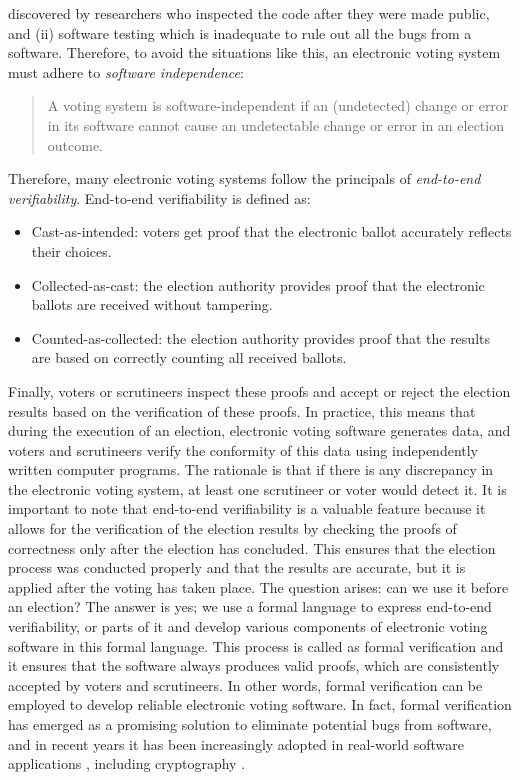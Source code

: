 \documentclass[conference,compsoc]{IEEEtran}
\begin{document}
discovered by researchers who inspected the code after they were made public, and 
(ii) software testing which is inadequate to rule out all the bugs 
from a software. Therefore, to avoid the situations like this, 
an electronic voting system must adhere to \textit{software independence}\cite{rivest2008notion}:
\begin{quote}
  A voting system is software-independent if an
  (undetected) change or error in its software cannot
  cause an undetectable change or error in an
  election outcome. 
\end{quote}
\noindent
Therefore, many electronic voting systems follow the principals 
of \textit{end-to-end verifiability}. End-to-end verifiability is 
defined as: 
\begin{itemize}
  \item Cast-as-intended: voters get proof that the electronic ballot accurately reflects their choices.
  \item Collected-as-cast: the election authority provides proof that the electronic ballots are received without tampering.
  \item Counted-as-collected: the election authority provides proof that the results are based on correctly counting all received ballots.
\end{itemize} 


\noindent 
Finally, voters or scrutineers inspect these proofs and accept or reject the election results based on 
the verification of these proofs. In practice, this means that during the execution of an election, 
electronic voting software generates data, and voters and scrutineers verify the conformity of 
this data using independently written computer programs. The rationale is that if there is 
any discrepancy in the electronic voting system, at least one scrutineer or voter would detect it.
It is important to note that end-to-end verifiability is a valuable feature because it 
allows for the verification of the election results by checking the proofs of correctness 
only after the election has concluded. This ensures that the election process was conducted 
properly and that the results are accurate, but it is applied after the voting has taken place.
The question arises: can we use it before an election?
The answer is yes; we use a formal language to express end-to-end verifiability, or parts of 
it and develop various components of electronic voting 
software in this formal language. This process is called as formal verification and it ensures 
that the software always produces valid proofs, 
which are consistently accepted by voters and scrutineers. In other words, formal verification
can be employed to develop reliable electronic voting software.
In fact, formal verification has emerged as a promising solution 
to eliminate potential bugs from software, and in recent years it has been increasingly 
adopted in real-world software applications \cite{10.1145/1111037.1111042}, 
including cryptography \cite{8835346,10.1145/3133956.3134043,190894,10.1145/2701415,
10.1145/2660267.2660370,10.1145/3319535.3363211}.
\end{document}
